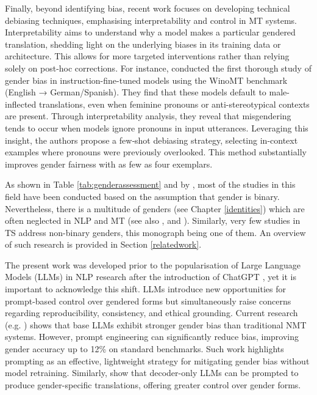 Finally, beyond identifying bias, recent work focuses on developing technical debiasing techniques, emphasising interpretability and control in MT systems. Interpretability aims to understand why a model makes a particular gendered translation, shedding light on the underlying biases in its training data or architecture. This allows for more targeted interventions rather than relying solely on post-hoc corrections. For instance, \textcite{attanasio-etal-2023-tale} conducted the first thorough study of gender bias in instruction-fine-tuned models using the WinoMT benchmark (English → German/Spanish). They find that these models default to male-inflected translations, even when feminine pronouns or anti-stereotypical contexts are present. Through interpretability analysis, they reveal that misgendering tends to occur when models ignore pronouns in input utterances. Leveraging this insight, the authors propose a few‑shot debiasing strategy, selecting in-context examples where pronouns were previously overlooked. This method substantially improves gender fairness with as few as four exemplars.

As shown in Table \ref{tab:genderassessment} and by \textcite{nettt2022}, most of the studies in this field have been conducted based on the assumption that gender is binary. Nevertheless, there is a multitude of genders (see Chapter \ref{identities}) which are often neglected in NLP and MT (see also \cite{sun2019mitigating}, \cite{cao-daume-iii-2020-toward} and \cite{dev-etal-2021-harms}). Similarly, very few studies in TS address non-binary genders, this monograph being one of them. An overview of such research is provided in Section \ref{relatedwork}.

The present work was developed prior to the popularisation of Large Language Models (LLMs) in NLP research after the introduction of ChatGPT \citep{wu2023brief}, yet it is important to acknowledge this shift. LLMs introduce new opportunities for prompt-based control over gendered forms but simultaneously raise concerns regarding reproducibility, consistency, and ethical grounding. Current research (e.g. \cite{sant-etal-2024-power}) shows that base LLMs exhibit stronger gender bias than traditional NMT systems. However, prompt engineering can significantly reduce bias, improving gender accuracy up to 12\% on standard benchmarks. Such work highlights prompting as an effective, lightweight strategy for mitigating gender bias without model retraining. Similarly, \textcite{sanchez-etal-2024-gender} show that decoder-only LLMs can be prompted to produce gender-specific translations, offering greater control over gender forms.


